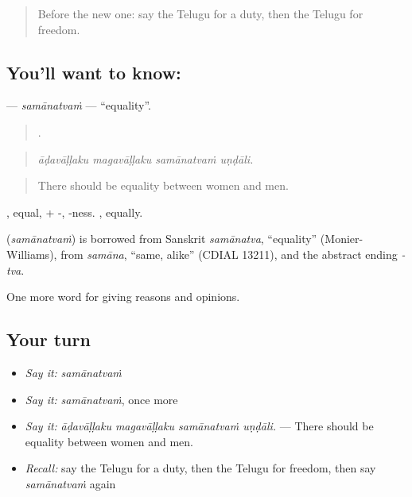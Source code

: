 \label{lesson:TE-C399-samanatvam}



\begin{quote}
Before the new one: say the Telugu for a duty, then the Telugu for freedom.
\end{quote}

\subsection*{You'll want to know: }
\textbf{} — \emph{samānatvaṁ} — \textquotedblleft{}equality\textquotedblright{}.

\begin{quote}
   .
\end{quote}

\begin{quote}
\emph{āḍavāḷḷaku magavāḷḷaku samānatvaṁ uṇḍāli.}
\end{quote}

\begin{quote}
There should be equality between women and men.
\end{quote}

, equal, + -, -ness. , equally.

\begin{cousinweb}
\textbf{} (\emph{samānatvaṁ}) is borrowed from Sanskrit \emph{samānatva}, \textquotedblleft{}equality\textquotedblright{} (Monier-Williams), from \emph{samāna}, \textquotedblleft{}same, alike\textquotedblright{} (CDIAL 13211), and the abstract ending \emph{-tva}.
\end{cousinweb}

\begin{grammarlens}[title={What you've built}]
One more word for giving reasons and opinions.
\end{grammarlens}

\subsection*{Your turn}
\begin{itemize}
\raggedright
  \item \emph{Say it:} \emph{samānatvaṁ}
  \item \emph{Say it:} \emph{samānatvaṁ}, once more
  \item \emph{Say it:} \emph{āḍavāḷḷaku magavāḷḷaku samānatvaṁ uṇḍāli.} — There should be equality between women and men.
  \item \emph{Recall:} say the Telugu for a duty, then the Telugu for freedom, then say \emph{samānatvaṁ} again
\end{itemize}

